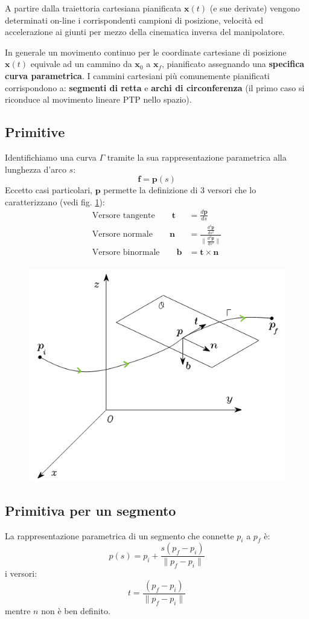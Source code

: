 A partire dalla traiettoria cartesiana pianificata $\bm{x}(t)$ (e sue derivate) vengono determinati on-line i corrispondenti campioni di posizione, velocità ed accelerazione ai giunti per mezzo della cinematica inversa del manipolatore.

In generale un movimento continuo per le coordinate cartesiane di posizione $\bm{x}(t)$ equivale ad un cammino da $\bm{x}_0$ a $\bm{x}_f$, pianificato assegnando una \textbf{specifica curva parametrica}. I cammini cartesiani più comunemente pianificati corrispondono a: \textbf{segmenti di retta} e \textbf{archi di circonferenza} (il primo caso si riconduce al movimento lineare PTP nello spazio).

\subsection{Primitive}
Identifichiamo una curva $\Gamma$ tramite la sua rappresentazione parametrica alla lunghezza d'arco $s$:
$$
\bm{f} = \bm{p}(s)
$$
Eccetto casi particolari, $\bm{p}$ permette la definizione di 3 versori che lo caratterizzano (vedi fig. \ref{fig:trajectories17}):
\begin{align*}
	\text{Versore tangente} \qquad \bm{t} &= \frac{d\bm{p}}{ds} \\[5pt]
	\text{Versore normale} \qquad \bm{n} &= \frac{\frac{d^2 \bm{p}}{ds^2}}{\| \frac{d^2 \bm{p}}{ds^2} \|} \\[5pt]
	\text{Versore binormale} \qquad \bm{b} &= \bm{t} \times \bm{n} \\[5pt]
\end{align*}
\begin{figure}[H]
	\centering
	\includegraphics[width=0.5\linewidth]{images/trajectories_17}
	\caption{}
	\label{fig:trajectories17}
\end{figure}



\subsection{Primitiva per un segmento}
La rappresentazione parametrica di un segmento che connette $p_i$ a $p_f$ è:
$$
p(s) = p_i + \frac{s(p_f - p_i)}{\| p_f - p_i \|}
$$
i versori:
$$
t = \frac{(p_f - p_i)}{\| p_f - p_i \|}
$$
mentre $n$ non è ben definito.



